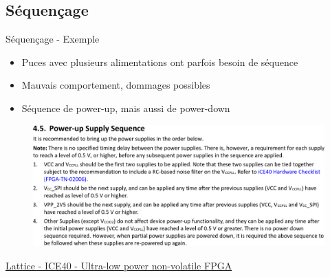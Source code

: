 \subsection{Séquençage}

\begin{frame}{Séquençage - Exemple}
    \begin{itemize}
        \item Puces avec plusieurs alimentations ont parfois besoin de séquence
        \item Mauvais comportement, dommages possibles
        \item Séquence de power-up, mais aussi de power-down
    \end{itemize}

    \vfill
    \begin{figure}
        \includegraphics[width=\textwidth, height=0.55\textheight, keepaspectratio]{pictures/ice40-power-supply-sequence.png}
    \end{figure}
    \href{https://www.latticesemi.com/view_document?document_id=49312}{Lattice - ICE40 - Ultra-low power non-volatile FPGA}
\end{frame}

